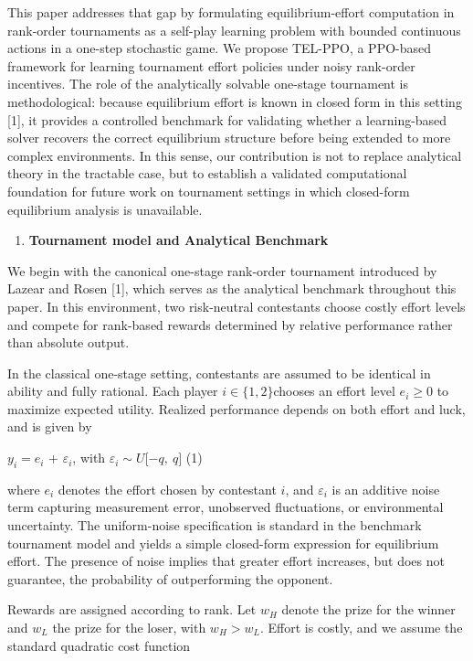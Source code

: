 \documentclass[
]{article}
\begin{document}
This paper addresses that gap by formulating equilibrium-effort
computation in rank-order tournaments as a self-play learning problem
with bounded continuous actions in a one-step stochastic game. We
propose TEL-PPO, a PPO-based framework for learning tournament effort
policies under noisy rank-order incentives. The role of the analytically
solvable one-stage tournament is methodological: because equilibrium
effort is known in closed form in this setting {[}1{]}, it provides a
controlled benchmark for validating whether a learning-based solver
recovers the correct equilibrium structure before being extended to more
complex environments. In this sense, our contribution is not to replace
analytical theory in the tractable case, but to establish a validated
computational foundation for future work on tournament settings in which
closed-form equilibrium analysis is unavailable.

\begin{enumerate}
\def\labelenumi{\arabic{enumi}.}
\setcounter{enumi}{2}
\item
  \textbf{Tournament model and Analytical Benchmark}
\end{enumerate}

We begin with the canonical one-stage rank-order tournament introduced
by Lazear and Rosen {[}1{]}, which serves as the analytical benchmark
throughout this paper. In this environment, two risk-neutral contestants
choose costly effort levels and compete for rank-based rewards
determined by relative performance rather than absolute output.

In the classical one-stage setting, contestants are assumed to be
identical in ability and fully rational. Each player
\(i \in \{ 1,2\}\)chooses an effort level \(e_{i} \geq 0\) to maximize
expected utility. Realized performance depends on both effort and luck,
and is given by

\(y_{i} = e_{i}\) + \(\varepsilon_{i}\), with
\(\varepsilon_{i}\sim U\lbrack - q,\ q\rbrack\) (1)

where \(e_{i}\) denotes the effort chosen by contestant \(i\), and
\(\varepsilon_{i}\) is an additive noise term capturing measurement
error, unobserved fluctuations, or environmental uncertainty. The
uniform-noise specification is standard in the benchmark tournament
model and yields a simple closed-form expression for equilibrium effort.
The presence of noise implies that greater effort increases, but does
not guarantee, the probability of outperforming the opponent.

Rewards are assigned according to rank. Let \(w_{H}\) denote the prize
for the winner and \(w_{L}\) the prize for the loser, with
\(w_{H} > w_{L}\). Effort is costly, and we assume the standard
quadratic cost function
\end{document}
